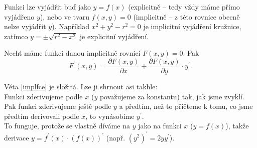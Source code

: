 \begin{pozn}
    Funkci lze vyjádřit buď jako $y=f(x)$ (explicitně -- tedy vždy máme přímo vyjádřeno
    $y$), nebo ve tvaru $f(x,y)=0$ (implicitně -- z této rovnice obecně nelze vyjádřit
    $y$). Například $x^2+y^2-r^2=0$ je implicitní vyjádření kružnice,
    zatímco $y=\pm \sqrt{r^2-x^2} $ je explicitní vyjádření.
\end{pozn}

\begin{veta}\label{implfce}
Nechť máme funkci danou implicitně rovnicí $F(x,y)=0$. Pak
$$F^\prime (x,y)=\frac{\partial F(x,y)}{\partial x} + \frac{\partial F(x,y)}{\partial y}\cdot y^\prime.$$
\end{veta}

\begin{pozn}
Věta \ref{implfce} je složitá. Lze ji shrnout asi takhle:\\
Funkci zderivujeme podle $x$ ($y$ považujeme za konstantu) tak, jak jsme zvyklí. Pak
funkci zderivujeme ještě podle $y$ a předtím, než to přičteme k tomu,
co jsme předtím derivovali podle $x$, to vynásobíme $y^\prime$. \\
To funguje,
protože se vlastně díváme na $y$ jako na funkci $x$ ($y=f(x)$), takže
derivace $y=f^\prime(x)\cdot (f(x))^\prime$ (např. $\left ( y^2 \right )^\prime =2yy^\prime$).
\end{pozn}
